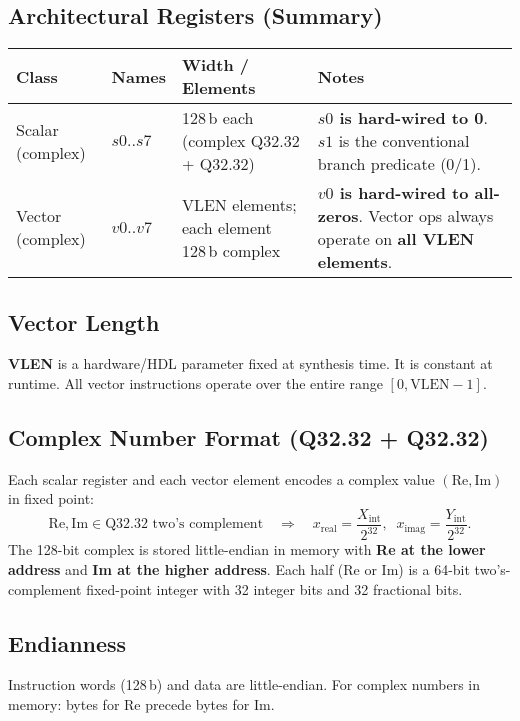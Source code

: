 \documentclass[10pt]{article}
\begin{document}
\subsection*{Architectural Registers (Summary)}
\begin{center}
\begin{table}[h]
\centering
\small
\begin{tabularx}{\linewidth}{|l|l|l|Y|}
\hline
\textbf{Class} & \textbf{Names} & \textbf{Width / Elements} & \textbf{Notes} \\
\hline
Scalar (complex) & $s0..s7$ & 128\,b each (complex Q32.32 + Q32.32) &
\textbf{$s0$ is hard-wired to 0}. $s1$ is the conventional branch predicate (0/1). \\
\hline
Vector (complex) & $v0..v7$ & VLEN elements; each element 128\,b complex &
\textbf{$v0$ is hard-wired to all-zeros}. Vector ops always operate on \textbf{all VLEN elements}. \\
\hline
\end{tabularx}
\end{table}

\end{center}

\subsection*{Vector Length}
\noindent \textbf{VLEN} is a hardware/HDL parameter fixed at synthesis time. It is constant at runtime. All vector instructions operate over the entire range $[0, \mathrm{VLEN}-1]$.

\subsection*{Complex Number Format (Q32.32 + Q32.32)}
Each scalar register and each vector element encodes a complex value $(\mathrm{Re}, \mathrm{Im})$ in fixed point:
\[
\mathrm{Re}, \mathrm{Im} \in \text{Q32.32 two’s complement} \quad\Rightarrow\quad
x_{\text{real}} = \frac{X_{\text{int}}}{2^{32}},\;\;
x_{\text{imag}} = \frac{Y_{\text{int}}}{2^{32}}.
\]
The 128-bit complex is stored little-endian in memory with \textbf{Re at the lower address} and \textbf{Im at the higher address}. Each half (Re or Im) is a 64-bit two’s-complement fixed-point integer with 32 integer bits and 32 fractional bits.

\subsection*{Endianness}
\noindent Instruction words (128\,b) and data are little-endian. For complex numbers in memory: bytes for \(\mathrm{Re}\) precede bytes for \(\mathrm{Im}\).
\end{document}
